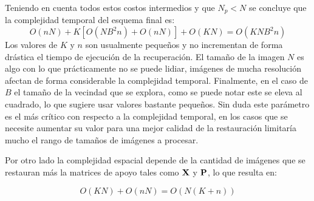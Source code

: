 Teniendo en cuenta todos estos costos intermedios y que $N_p < N$ se concluye que la complejidad temporal del esquema final es:
\begin{equation}
	O(nN) + K[O(NB^2n) + O(nN)] + O(KN) = \boxed{O(KNB^2n)}
	\label{eq:temporal_complexity}
\end{equation}
Los valores de $K$ y $n$ son usualmente pequeños y no incrementan de forma drástica el tiempo de ejecuci\'on de la recuperaci\'on. El tamaño de la imagen $N$ es algo con lo que pr\'acticamente no se puede lidiar, im\'agenes de mucha resoluci\'on afectan de forma considerable la complejidad temporal. Finalmente, en el caso de $B$ el tamaño de la vecindad que se explora, como se puede notar este se eleva al cuadrado, lo que sugiere usar valores bastante pequeños. Sin duda este par\'ametro es el m\'as cr\'itico con respecto a la complejidad temporal, en los casos que se necesite aumentar su valor para una mejor calidad de la restauraci\'on limitar\'ia mucho el rango de tamaños de im\'agenes a procesar.

Por otro lado la complejidad espacial depende de la cantidad de im\'agenes que se restauran m\'as la matrices de apoyo tales como $\X$ y $\P$, lo que resulta en:

\begin{equation}
	O(KN) + O(nN) = \boxed{O(N(K + n))}
	\label{eq:spacial_complexity}
\end{equation}